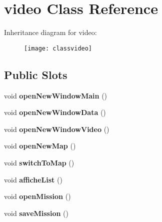 \hypertarget{classvideo}{\section{video Class Reference}
\label{classvideo}
}
Inheritance diagram for video\-:\begin{figure}[H]
\begin{center}
\leavevmode
\texttt{[image: classvideo]}
\end{center}
\end{figure}
\subsection*{Public Slots}
\begin{DoxyCompactItemize}
\item 
\hypertarget{classvideo_a07e2e80730a038ab3ca25ea9b7b1b68f}{void {\bfseries open\-New\-Window\-Main} ()}\label{classvideo_a07e2e80730a038ab3ca25ea9b7b1b68f}

\item 
\hypertarget{classvideo_ad6d3a4d6d1a2388a4b39e0fb3dcfdc81}{void {\bfseries open\-New\-Window\-Data} ()}\label{classvideo_ad6d3a4d6d1a2388a4b39e0fb3dcfdc81}

\item 
\hypertarget{classvideo_a76be350e33bf35542dcbe1678075b2cc}{void {\bfseries open\-New\-Window\-Video} ()}\label{classvideo_a76be350e33bf35542dcbe1678075b2cc}

\item 
\hypertarget{classvideo_a0946113437ee568b6084568a9fb93d42}{void {\bfseries open\-New\-Map} ()}\label{classvideo_a0946113437ee568b6084568a9fb93d42}

\item 
\hypertarget{classvideo_a1b23801f6e6f1cff3dfb07913e53c68e}{void {\bfseries switch\-To\-Map} ()}\label{classvideo_a1b23801f6e6f1cff3dfb07913e53c68e}

\item 
\hypertarget{classvideo_aacd4427c4872602eb4f3e4cfe5e3eba5}{void {\bfseries affiche\-List} ()}\label{classvideo_aacd4427c4872602eb4f3e4cfe5e3eba5}

\item 
\hypertarget{classvideo_ab5563de110cb224cdee5108b683c22b2}{void {\bfseries open\-Mission} ()}\label{classvideo_ab5563de110cb224cdee5108b683c22b2}

\item 
\hypertarget{classvideo_ada50ee66e21bb94a2237b4e05db9d39e}{void {\bfseries save\-Mission} ()}\label{classvideo_ada50ee66e21bb94a2237b4e05db9d39e}


\end{DoxyCompactItemize}
